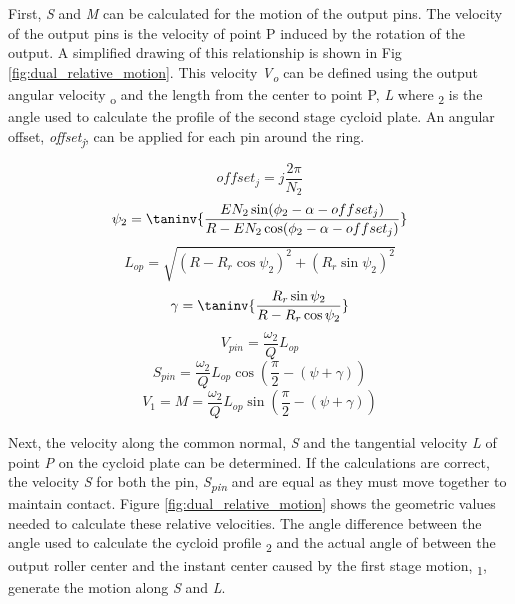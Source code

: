 First, \textit{S} and \textit{M} can be calculated for the motion of the output pins. The velocity of the output pins is the velocity of point P induced by the rotation of the output. A simplified drawing of this relationship is shown in Fig \ref{fig:dual_relative_motion}. This velocity \textit{V\textsubscript{o}} can be defined using the output angular velocity \textomega\textsubscript{o} and the length from the center to point P, \textit{L} where \textpsi\textsubscript{2} is the angle used to calculate the profile of the second stage cycloid plate. An angular offset, \textit{offset\textsubscript{j}}, can be applied for each pin around the ring. 

\begin{equation}\label{eq:offset2}
offset_j = j \frac{2\pi}{N_2}
\end{equation}
\begin{equation}\label{eq:psi2}
\psi_2 = \taninv{\frac{E N_2 \sin(\phi_2-\alpha-offset_j)}{R-E N_2\cos(\phi_2-\alpha-offset_j)}}
\end{equation}
\begin{equation} \label{eq:l_op}
L_{op} = \sqrt{(R-R_r\cos\psi_2)^2 + (R_r\sin\psi_2)^2}
\end{equation}
\begin{equation}
\gamma = \taninv{\frac{R_r\sin\psi_2}{R-R_r\cos\psi_2}}
\end{equation}
\begin{equation}
V_{pin} = \frac{\omega_2}{Q} L_{op}
\end{equation}
\begin{equation} \label{eq:s_pin}
S_{pin} = \frac{\omega_2}{Q} L_{op} \cos(\frac{\pi}{2}-(\psi+\gamma))
\end{equation}
\begin{equation}
V_{1} = M = \frac{\omega_2}{Q} L_{op} \sin(\frac{\pi}{2}-(\psi+\gamma))
\end{equation}


Next, the velocity along the common normal, \textit{S} and the tangential velocity \textit{L} of point \textit{P} on the cycloid plate can be determined. If the calculations are correct, the velocity \textit{S} for both the pin, \textit{S\textsubscript{pin}} and  are equal as they must move together to maintain contact. Figure \ref{fig:dual_relative_motion} shows the geometric values needed to calculate these relative velocities. The angle difference between the angle used to calculate the cycloid profile \textpsi\textsubscript{2} and the actual angle of between the output roller center and the instant center caused by the first stage motion, \textpsi\textsubscript{1}, generate the motion along \textit{S} and \textit{L}. 

